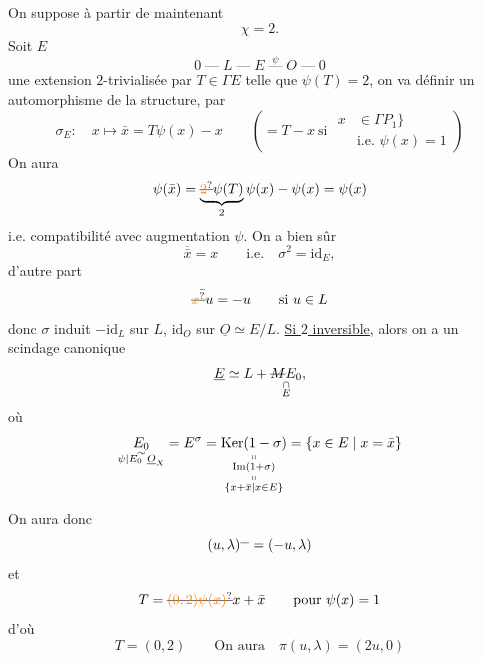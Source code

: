 On suppose à partir de maintenant
\[
\chi=2.
\]
Soit $E$
\[
0\mathrel{\text{---}}L\mathrel{\text{---}}E\overset{\psi}{\mathrel{\text{---}}}O\mathrel{\text{---}}0
\]
une extension $2$-trivialisée par $T\in\Gamma E$ telle que $\psi(T)=2$, on va définir un automorphisme de la structure, par
\[
\sigma_E:\quad x\longmapsto\bar{x}=T\psi(x)-x
\qquad\left(=T-x\ \text{si }
  \begin{aligned}x&\in\Gamma P_1\big\}\\[-2pt]
  &\text{i.e. }\psi(x)=1\end{aligned}\right)
\]
On aura
\[
\psi(\bar{x})=\underbrace{\deleted{\unsure{2}}\psi(T)}_{2}\psi(x)-\psi(x)=\psi(x)
\]
i.e. compatibilité avec augmentation $\psi$.
On a bien sûr
\[
\overline{\bar{x}}=x\qquad\text{i.e.}\quad\sigma^2=\mathrm{id}_E,
\]
d'autre part
\[
\bar{\deleted{\unsure{x}}u}=-u\qquad\text{si }u\in L
\]
donc $\sigma$ induit $-\mathrm{id}_L$ sur $L$, $\mathrm{id}_O$ sur $\underline O\simeq E/L$.
\uline{Si $2$ inversible}, alors on a un scindage canonique
\[
\underline E\simeq L+\underset{\substack{\cap\\E}}{\deleted{M}E_0},
\]
où
\[
\underset{\substack{\sim\\[-2pt]\psi|E_0\ \underline O_X}}{E_0}=E^\sigma=
\underset{\substack{\shortparallel\\\operatorname{Im}(1+\sigma)\\\shortparallel\\
\{x+\bar{x}\mid x\in E\}}}{\operatorname{Ker}(1-\sigma)}
=\{x\in E\mid x=\bar{x}\}
\]

On aura donc
\[
(u,\lambda)^{\rule{.62em}{.35pt}}=(-u,\lambda)
\]
et
\[
T=\deleted{\unsure{(0,2)\psi(x)}}x+\bar{x}\qquad\text{pour }\psi(x)=1
\]
d'où
\[
\boxed{T=(0,2)}\qquad\text{On aura}\quad\boxed{\pi(u,\lambda)=(2u,0)}
\]
